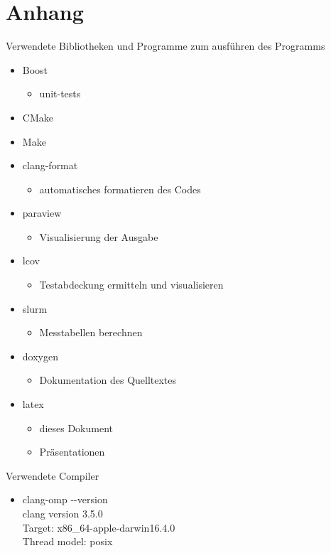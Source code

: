 \documentclass[
	12pt,
	a4paper,
	BCOR10mm,
	DIV14,
	headsepline,
]{scrreprt}
\begin{document}
\chapter{Anhang}
\label{Anhang}
Verwendete Bibliotheken und Programme zum ausführen des Programms
\begin{itemize}
	\item Boost
	\begin{itemize}
		\item unit-tests
	\end{itemize}
	\item CMake 
	\item Make
	\item clang-format
	\begin{itemize}
		\item automatisches formatieren des Codes
	\end{itemize}
	\item paraview
	\begin{itemize}
		\item Visualisierung der Ausgabe
	\end{itemize}
	\item lcov
	\begin{itemize}
		\item Testabdeckung ermitteln und visualisieren
	\end{itemize}
	\item slurm
	\begin{itemize}
		\item Messtabellen berechnen
	\end{itemize}
	\item doxygen
	\begin{itemize}
		\item Dokumentation des Quelltextes
	\end{itemize}
	\item latex
	\begin{itemize}
		\item dieses Dokument
		\item Präsentationen
	\end{itemize}
\end{itemize}
Verwendete Compiler
\begin{itemize}
	\item clang-omp -{}-version\\clang version 3.5.0 \\Target: x86\_64-apple-darwin16.4.0\\Thread model: posix	
\end{itemize}
\end{document}

